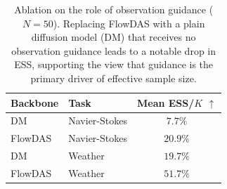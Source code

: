 \documentclass{article}
\theoremstyle{plain}
\theoremstyle{definition}
\theoremstyle{remark}
\begin{document}
\begin{table}[t]
\caption{Ablation on the role of observation guidance ($N=50$). Replacing FlowDAS with a plain diffusion model (DM) that receives no observation guidance leads to a notable drop in ESS, supporting the view that guidance is the primary driver of effective sample size.}
\label{tab:ess_ablation_guidance}
\begin{center}
\begin{small}
\begin{sc}
\begin{tabular}{llc}
\toprule
Backbone & Task & Mean ESS/$K$ $\uparrow$ \\
\midrule
DM       & Navier-Stokes & $7.7\%$  \\
FlowDAS  & Navier-Stokes & $20.9\%$ \\
\midrule
DM       & Weather       & $19.7\%$ \\
FlowDAS  & Weather       & $51.7\%$ \\
\bottomrule
\end{tabular}
\end{sc}
\end{small}
\end{center}
\end{table}
\end{document}

